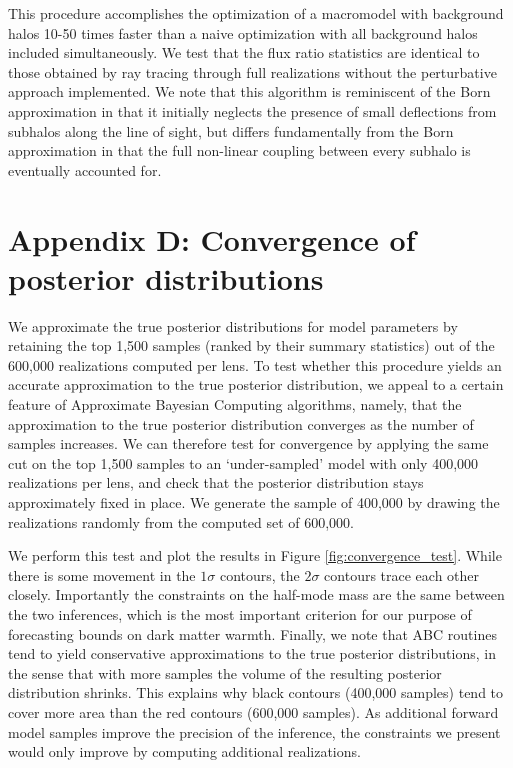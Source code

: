 This procedure accomplishes the optimization of a macromodel with background halos 10-50 times faster than a naive optimization with all background halos included simultaneously. We test that the flux ratio statistics are identical to those obtained by ray tracing through full realizations without the perturbative approach implemented. We note that this algorithm is reminiscent of the Born approximation in that it initially neglects the presence of small deflections from subhalos along the line of sight, but differs fundamentally from the Born approximation in that the full non-linear coupling between every subhalo is eventually accounted for. 

\section{\bf Appendix D: Convergence of posterior distributions}
\label{app:D}

We approximate the true posterior distributions for model parameters by retaining the top 1,500 samples (ranked by their summary statistics) out of the 600,000 realizations computed per lens. To test whether this procedure yields an accurate approximation to the true posterior distribution, we appeal to a certain feature of Approximate Bayesian Computing algorithms, namely, that the approximation to the true posterior distribution converges as the number of samples increases. We can therefore test for convergence by applying the same cut on the top 1,500 samples to an `under-sampled' model with only 400,000 realizations per lens, and check that the posterior distribution stays approximately fixed in place. We generate the sample of 400,000 by drawing the realizations randomly from the computed set of 600,000.

We perform this test and plot the results in Figure \ref{fig:convergence_test}. While there is some movement in the $1 \sigma$ contours, the $2 \sigma$ contours trace each other closely. Importantly the constraints on the half-mode mass are the same between the two inferences, which is the most important criterion for our purpose of forecasting bounds on dark matter warmth. Finally, we note that ABC routines tend to yield conservative approximations to the true posterior distributions, in the sense that with more samples the volume of the resulting posterior distribution shrinks. This explains why black contours (400,000 samples) tend to cover more area than the red contours (600,000 samples). As additional forward model samples improve the precision of the inference, the constraints we present would only improve by computing additional realizations.  

